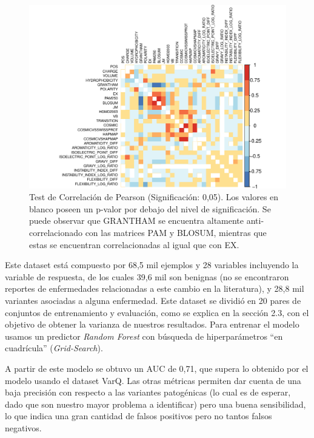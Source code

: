 

\begin{figure}[H]
    \centering
    \includegraphics[scale=0.8]{documents/latex/figures/3/corrplot_1.pdf}
    \caption{Test de Correlación de Pearson (Significación: 0,05). Los valores en blanco poseen un p-valor por debajo del nivel de significación. Se puede observar que GRANTHAM se encuentra altamente anti-correlacionado con las matrices PAM y BLOSUM, mientras que estas se encuentran correlacionadas al igual que con EX.}
    \label{fig:corrplot_1}
\end{figure}

Este dataset está compuesto por 68,5 mil ejemplos y 28 variables incluyendo la variable de respuesta, de los cuales 39,6 mil son benignas (no se encontraron reportes de enfermedades relacionadas a este cambio en la literatura), y 28,8 mil variantes asociadas a alguna enfermedad. Este dataset se dividió en 20 pares de conjuntos de entrenamiento y evaluación, como se explica en la sección 2.3, con el objetivo de obtener la varianza de nuestros resultados. 
Para entrenar el modelo usamos un predictor \textit{Random Forest} con búsqueda de hiperparámetros ``en cuadrícula'' (\textit{Grid-Search}). 

A partir de este modelo se obtuvo un AUC de 0,71, que supera lo obtenido por el modelo usando el dataset VarQ. Las otras métricas permiten dar cuenta de una baja precisión con respecto a las variantes patogénicas (lo cual es de esperar, dado que son nuestro mayor problema a identificar) pero una buena sensibilidad, lo que indica una gran cantidad de falsos positivos pero no tantos falsos negativos.

